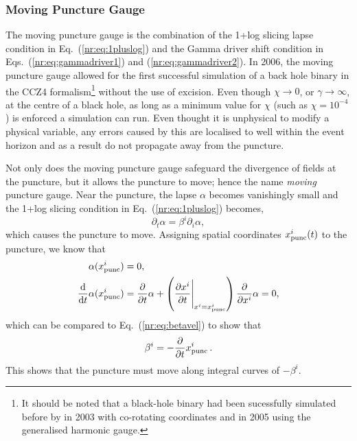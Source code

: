 \subsubsection{Moving Puncture Gauge}
The moving puncture gauge is the combination of the 1+log slicing lapse condition in Eq.~(\ref{nr:eq:1pluslog}) and the Gamma driver shift condition in Eqs.~(\ref{nr:eq:gammadriver1}) and (\ref{nr:eq:gammadriver2}). In 2006, the moving puncture gauge allowed for the first successful simulation of a back hole binary \cite{PhysRevLett.96.111101} in the CCZ4 formalism\footnote{It should be noted that a black-hole binary had been sucessfully simulated before by \cite{Bruegmann:2003aw} in 2003 with co-rotating coordinates and \cite{Pretorius:2005gq} in 2005 using the generalised harmonic gauge.} without the use of excision. Even though $\chi\rightarrow 0$, or $\gamma \rightarrow \infty$, at the centre of a black hole, as long as a minimum value for $\chi$ (such as $\chi=10^{-4}$) is enforced a simulation can run. Even thought it is unphysical to modify a physical variable, any errors caused by this are localised to well within the event horizon and as a result do not propagate away from the puncture. 

Not only does the moving puncture gauge safeguard the divergence of fields at the puncture, but it allows the puncture to move; hence the name {\it moving} puncture gauge. Near the puncture, the lapse $\alpha$ becomes vanishingly small and the 1+log slicing condition in Eq.~(\ref{nr:eq:1pluslog}) becomes,
\begin{equation}
\partial_t \alpha = \beta^i \partial_i \alpha, \label{nr:eq:betavel}
\end{equation}
which causes the puncture to move. Assigning spatial coordinates $x^i_{\rm punc}(t)$ to the puncture, we know that
\begin{align}
\alpha(x^i_{\rm punc}) &= 0,\\
\frac{\dd}{\dd t} \alpha(x^i_{\rm punc})  &= \frac{\partial}{\partial t}\alpha + \left(\frac{\partial x^i}{\partial t}\Bigg|_{x^i=x^i_{\rm punc}}\right)\frac{\partial}{\partial x^i} \alpha =0,
\end{align}
which can be compared to Eq.~(\ref{nr:eq:betavel}) to show that
\begin{equation}
\beta^i = -\frac{\partial }{\partial t}x^i_{\rm punc}\,.
\end{equation}
This shows that the puncture must move along integral curves of $-\beta^i$.



